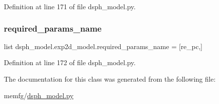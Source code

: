 Definition at line 171 of file dsph\+\_\+model.\+py.

\mbox{\label{classdsph__model_1_1exp2d__model_a13fbfe2cc261b70c40dc6635f409f837}} 
\subsubsection{\texorpdfstring{required\+\_\+params\+\_\+name}{required\_params\_name}}
{\footnotesize\ttfamily list dsph\+\_\+model.\+exp2d\+\_\+model.\+required\+\_\+params\+\_\+name = \mbox{[}\textquotesingle{}re\+\_\+pc\textquotesingle{},\mbox{]}\hspace{0.3cm}{\ttfamily [static]}}



Definition at line 172 of file dsph\+\_\+model.\+py.



The documentation for this class was generated from the following file\+:\begin{DoxyCompactItemize}
\item 
memfg/\hyperlink{dsph__model_8py}{dsph\+\_\+model.\+py}\end{DoxyCompactItemize}
